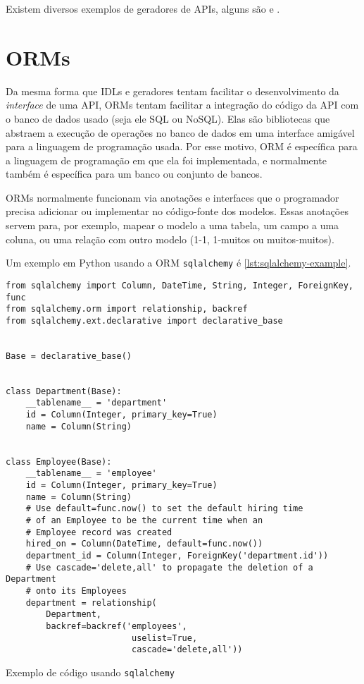 Existem diversos exemplos de geradores de APIs, alguns são \cite{openapi:gen} e
\cite{googl:protobuf}.

\section{ORMs}

Da mesma forma que IDLs e geradores tentam facilitar o desenvolvimento da
\textit{interface} de uma API, ORMs tentam facilitar a integração do código da
API com o banco de dados usado (seja ele SQL ou NoSQL). Elas são bibliotecas que
abstraem a execução de operações no banco de dados em uma interface amigável para
a linguagem de programação usada. Por esse motivo, ORM é específica para a linguagem
de programação em que ela foi implementada, e normalmente também é específica para
um banco ou conjunto de bancos.

ORMs normalmente funcionam via anotações e interfaces que o programador precisa
adicionar ou implementar no código-fonte dos modelos. Essas anotações servem para,
por exemplo, mapear o modelo a uma tabela, um campo a uma coluna, ou uma relação
com outro modelo (1-1, 1-muitos ou muitos-muitos).

Um exemplo em Python usando a ORM \texttt{sqlalchemy} é \cref{lst:sqlalchemy-example}.

\begin{listing}[ht]
\begin{verbatim}
from sqlalchemy import Column, DateTime, String, Integer, ForeignKey, func
from sqlalchemy.orm import relationship, backref
from sqlalchemy.ext.declarative import declarative_base


Base = declarative_base()


class Department(Base):
    __tablename__ = 'department'
    id = Column(Integer, primary_key=True)
    name = Column(String)


class Employee(Base):
    __tablename__ = 'employee'
    id = Column(Integer, primary_key=True)
    name = Column(String)
    # Use default=func.now() to set the default hiring time
    # of an Employee to be the current time when an
    # Employee record was created
    hired_on = Column(DateTime, default=func.now())
    department_id = Column(Integer, ForeignKey('department.id'))
    # Use cascade='delete,all' to propagate the deletion of a Department
    # onto its Employees
    department = relationship(
        Department,
        backref=backref('employees',
                         uselist=True,
                         cascade='delete,all'))

\end{verbatim}
\caption{Exemplo de código usando \texttt{sqlalchemy}}
\label{lst:sqlalchemy-example}
\end{listing}

